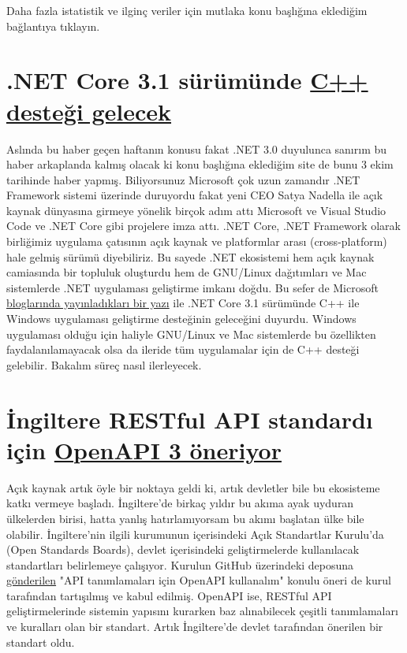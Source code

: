 \documentclass[11pt]{article}
\begin{document}
Daha fazla istatistik ve ilginç veriler için mutlaka konu başlığına eklediğim
bağlantıya tıklayın.
\section{.NET Core 3.1 sürümünde \href{https://www.infoq.com/news/2019/10/CPP-CLI-NetCore/}{C++ desteği gelecek}}
\label{sec:org2ce2d7d}
Aslında bu haber geçen haftanın konusu fakat .NET 3.0 duyulunca sanırım bu
haber arkaplanda kalmış olacak ki konu başlığına eklediğim site de bunu 3 ekim
tarihinde haber yapmış. Biliyorsunuz Microsoft çok uzun zamandır .NET Framework
sistemi üzerinde duruyordu fakat yeni CEO Satya Nadella ile açık kaynak
dünyasına girmeye yönelik birçok adım attı Microsoft ve Visual Studio Code ve
.NET Core gibi projelere imza attı. .NET Core, .NET Framework olarak birliğimiz
uygulama çatısının açık kaynak ve platformlar arası (cross-platform) hale
gelmiş sürümü diyebiliriz. Bu sayede .NET ekosistemi hem açık kaynak camiasında
bir topluluk oluşturdu hem de GNU/Linux dağıtımları ve Mac sistemlerde .NET
uygulaması geliştirme imkanı doğdu. Bu sefer de Microsoft \href{https://devblogs.microsoft.com/cppblog/the-future-of-cpp-cli-and-dotnet-core-3/}{bloglarında
yayınladıkları bir yazı} ile .NET Core 3.1 sürümünde C++ ile Windows uygulaması
geliştirme desteğinin geleceğini duyurdu. Windows uygulaması olduğu için
haliyle GNU/Linux ve Mac sistemlerde bu özellikten faydalanılamayacak olsa da
ileride tüm uygulamalar için de C++ desteği gelebilir. Bakalım süreç nasıl
ilerleyecek.
\section{İngiltere RESTful API standardı için \href{https://technology.blog.gov.uk/2019/10/02/improve-csvs-and-api-descriptions-with-these-open-standards-board-recommendations/}{OpenAPI 3 öneriyor}}
\label{sec:org2b4808a}
Açık kaynak artık öyle bir noktaya geldi ki, artık devletler bile bu ekosisteme
katkı vermeye başladı. İngiltere'de birkaç yıldır bu akıma ayak uyduran
ülkelerden birisi, hatta yanlış hatırlamıyorsam bu akımı başlatan ülke bile
olabilir. İngiltere'nin ilgili kurumunun içerisindeki Açık Standartlar
Kurulu'da (Open Standards Boards), devlet içerisindeki geliştirmelerde
kullanılacak standartları belirlemeye çalışıyor. Kurulun GitHub üzerindeki
deposuna \href{https://github.com/alphagov/open-standards/issues/31}{gönderilen} "API tanımlamaları için OpenAPI kullanalım" konulu öneri de
kurul tarafından tartışılmış ve kabul edilmiş. OpenAPI ise, RESTful API
geliştirmelerinde sistemin yapısını kurarken baz alınabilecek çeşitli
tanımlamaları ve kuralları olan bir standart. Artık İngiltere'de devlet
tarafından önerilen bir standart oldu.
\end{document}
